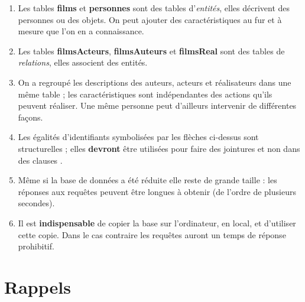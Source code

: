 \begin{enumerate}
  \item Les tables {\bf films} et  {\bf personnes} sont des tables d'{\it entités}, elles décrivent des personnes ou des objets. On peut ajouter des caractéristiques au fur et à mesure que l'on en a connaissance.
  \item Les tables {\bf filmsActeurs}, {\bf filmsAuteurs} et {\bf filmsReal} sont des tables de {\it relations}, elles associent des entités.
  \item On a regroupé les descriptions des auteurs, acteurs et réalisateurs dans une même table ; les caractéristiques sont indépendantes des actions qu'ils peuvent réaliser. Une même personne peut d'ailleurs intervenir de différentes façons.
  \item Les égalités d'identifiants symbolisées par les flèches ci-dessus sont structurelles ; elles {\bf devront} être utilisées pour faire des jointures et non dans des clauses .
  \item Même si la base de données a été réduite elle reste de grande taille : les réponses aux requêtes peuvent être longues à obtenir (de l'ordre de plusieurs secondes).
  \item Il est {\bf indispensable} de copier la base sur l'ordinateur, en local, et d'utiliser cette copie. Dans le cas contraire les requêtes auront un temps de réponse prohibitif. 
\end{enumerate}
\section{Rappels}
